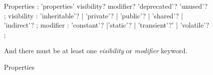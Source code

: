 \begin{figure}[h]
\caption{Properties}
\begin{rail}
Properties : 'properties'  visibility? modifier? 'deprecated'? 'unused'?
               ;
visibility : 'inheritable'? | 'private'? | 'public'? | 'shared'? | 'indirect'? 
               ;
modifier : 'constant'? |'static'? | 'transient'?' | 'volatile'? 
               ;
\end{rail}
And there must be at least one \emph{visibility} or \emph{modifier} keyword.
\end{figure}